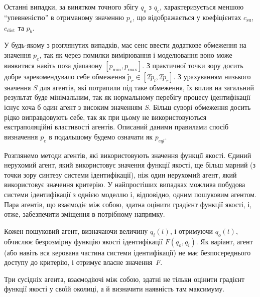 \documentclass[a4paper,13pt]{atuaref}
\begin{document}
Останні випадки, за винятком точного збігу $q_o$ з $q_c$,
характеризується меншою ``упевненістю'' в отриманому значенню $p_e$,
що відображається у коефіцієнтах
$c_\mathrm{su}$, $c_\mathrm{dist}$ та  $p_b$.

У будь-якому з розглянутих випадків, має сенс ввести додаткове обмеження на
значення $ p_e $, так як через помилки вимірювання і моделювання воно може
виявитися навіть поза діапазону $ [p_{\min}, p_{\max}] $. З практичної
точки зору досить добре зарекомендувало себе обмеження
$ \tilde {p}_r \in [2 \tilde{p}_l, 2 \tilde{p}_r] $.
З урахуванням низького значення $ S $ для
агентів, які потрапили під таке обмеження, їх вплив на загальний результат буде
мінімальним, так як нормальному перебігу процесу ідентифікації існує хоча б
один агент з високим значенням $ S $. Більш суворі обмеження досить рідко
виправдовують себе, так як при цьому не використовуються екстраполяційні
властивості агентів.
Описаний даними правилами спосіб визначення $ p_e $ в подальшому будемо
означати як $p_{eql} $\label{atu:d:p_eql}.


Розглянемо методи агентів, які використовують значення функції якості. Єдиний
нерухомий агент, який використовує значення функції якості, ще більш марний (з
точки зору синтезу системи ідентифікації), ніж один нерухомий агент, який
використовує значення критерію.
У найпростіших випадках можлива побудова системи ідентифікації з однією моделлю
і, відповідно, одним пошуковим агентом.
Пара агентів, що взаємодіє між собою, здатна оцінити градієнт функції якості,
і, отже, забезпечити зміщення в потрібному напрямку.

Кожен пошуковий агент, визначаючи величину $ q_ {i} (t) $, і отримуючи $ q_o(t) $,
обчислює безрозмірну функцію якості ідентифікації $ F (q_o, q_i) $. Як
варіант, агент (або навіть вся керована частина системи ідентифікації) не має
безпосереднього доступу до критерію, і отримує власне значення~$F$.

Три сусідніх агента, взаємодіючі між собою, здатні не тільки оцінити градієнт
функції якості у своїй околиці, а й визначити наявність там
максимуму.
\end{document}
